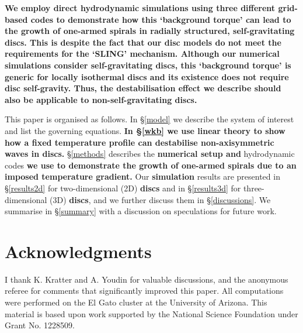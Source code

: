 \documentclass[useAMS,usenatbib]{mn2e}
\begin{document}
{\bf We employ direct hydrodynamic simulations using three different
  grid-based codes to demonstrate how this `background torque' 
  can lead to the growth of one-armed spirals in radially structured, 
  self-gravitating discs. This is despite the fact that our disc
  models do not meet the requirements for the `SLING'
  mechanism. Although our numerical simulations consider
  self-gravitating discs, this `background torque' is generic for
  locally isothermal discs and its existence does not require
  disc self-gravity. Thus, the destabilisation effect we
  describe should also be applicable to non-self-gravitating discs.  
}

This paper is organised as follows. In \S\ref {model} we describe the system of interest
and list the governing equations. {\bf In \S\ref{wkb} we use linear theory  to show
  how a fixed temperature profile 
  can destabilise non-axisymmetric waves in discs.} \S\ref{methods} describes
the {\bf numerical setup and} hydrodynamic codes {\bf we use to 
  demonstrate the growth of one-armed spirals due to an imposed
  temperature gradient.} Our {\bf
  simulation} results are presented in  \S\ref{results2d} for two-dimensional (2D) {\bf
  discs} and in \S\ref{results3d} for three-dimensional (3D) {\bf discs}, and we further
discuss them in \S\ref{discussions}. We summarise in \S\ref{summary} 
with a discussion on speculations for future work. 







{\bf
\section*{Acknowledgments}
I thank K. Kratter and A. Youdin for valuable discussions, and the
anonymous referee for comments that significantly improved this paper. All
computations were performed on the El Gato cluster at the University
of Arizona. This material is based upon work supported by the National
Science Foundation under Grant No. 1228509. 
}



\appendix

\end{document}
